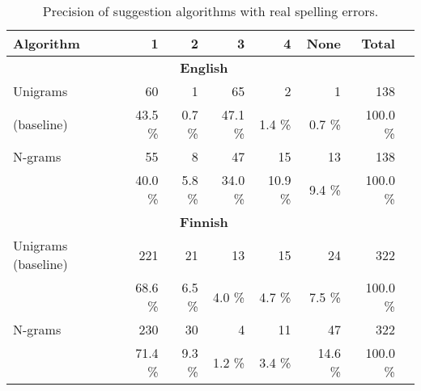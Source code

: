\documentclass{llncs}
\begin{document}
\begin{table*}[h]
    \caption{Precision of suggestion algorithms with real spelling errors.
    \label{table:real-eval}}
  \begin{center}
    \begin{scriptsize}
      \begin{tabular}{lrrrrrrr}
        \hline
        Algorithm & 1 & 2 & 3 & 4 & None & Total \\
        \hline
        \multicolumn{7}{c}{\textbf{English}} \\
        \hline
        Unigrams 
& 60 & 1 & 65 & 2 & 1 & 138 \\
        (baseline) 
& 43.5 \% & 0.7 \% & 47.1 \% & 1.4 \% & 0.7 \%  & 100.0 \% \\
        \hline
        N-grams 
& 55    & 8    & 47    & 15    & 13    & 138 \\
& 40.0 \% & 5.8 \% & 34.0 \% & 10.9 \% & 9.4 \% & 100.0 \% \\
        \hline
        \multicolumn{7}{c}{\textbf{Finnish}} \\
        \hline
        Unigrams  
        (baseline) 
& 221    & 21    & 13    & 15    & 24    & 322 \\
& 68.6 \% & 6.5 \% & 4.0 \% & 4.7 \% & 7.5 \% & 100.0 \% \\

        \hline
        N-grams
& 230    & 30    & 4    & 11    & 47    & 322 \\
& 71.4 \% & 9.3 \% & 1.2 \% & 3.4 \% & 14.6 \% & 100.0 \% \\
        \hline
      \end{tabular}
    \end{scriptsize}
  \end{center}
\end{table*}
\end{document}
